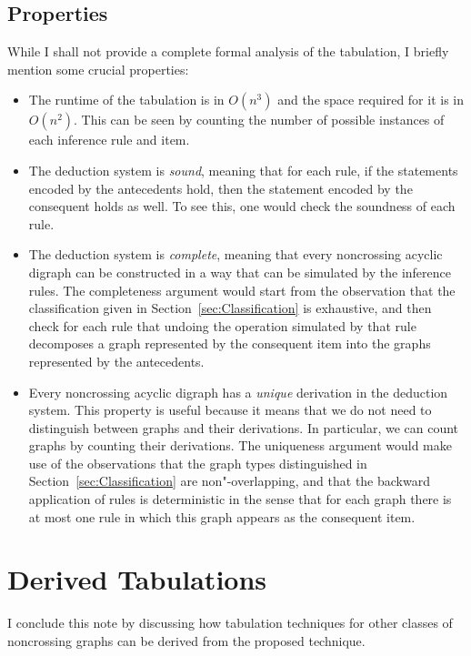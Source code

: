 \documentclass[a4paper]{article}
\begin{document}
\subsection{Properties}

While I shall not provide a complete formal analysis of the tabulation, I briefly mention some crucial properties:
\begin{itemize}
	\item The runtime of the tabulation is in $O(n^3)$ and the space required for it is in $O(n^2)$. This can be seen by counting the number of possible instances of each inference rule and item.
	
	\item The deduction system is \emph{sound}, meaning that for each rule, if the statements encoded by the antecedents hold, then the statement encoded by the consequent holds as well. To see this, one would check the soundness of each rule.
	
	\item The deduction system is \emph{complete}, meaning that every noncrossing acyclic digraph can be constructed in a way that can be simulated by the inference rules. The completeness argument would start from the observation that the classification given in Section~\ref{sec:Classification} is exhaustive, and then check for each rule that undoing the operation simulated by that rule decomposes a graph represented by the consequent item into the graphs represented by the antecedents.
	
	\item Every noncrossing acyclic digraph has a \emph{unique} derivation in the deduction system. This property is useful because it means that we do not need to distinguish between graphs and their derivations. In particular, we can count graphs by counting their derivations. The uniqueness argument would make use of the observations that the graph types distinguished in Section~\ref{sec:Classification} are non"-overlapping, and that the backward application of rules is deterministic in the sense that for each graph there is at most one rule in which this graph appears as the consequent item.
\end{itemize}


\section{Derived Tabulations}

I conclude this note by discussing how tabulation techniques for other classes of noncrossing graphs can be derived from the proposed technique.
\end{document}
